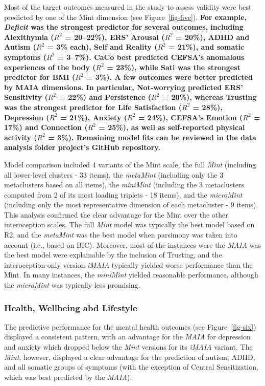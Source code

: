 \documentclass[
  man,
  floatsintext,
  longtable,
  nolmodern,
  notxfonts,
  notimes,
  mask,
  colorlinks=true,linkcolor=blue,citecolor=blue,urlcolor=blue]{apa7}
\begin{document}
Most of the target outcomes measured in the study to assess validity
were best predicted by one of the Mint dimension (see
Figure~\ref{fig-five}). \textbf{For example, \emph{Deficit} was the
strongest predictor for several outcomes, including Alexithymia (\(R^2\)
= 20--22\%), ERS' Arousal (\(R^2\) = 20\%), ADHD and Autism (\(R^2\) =
3\% each), Self and Reality (\(R^2\) = 21\%), and somatic symptoms
(\(R^2\) = 3--7\%). CaCo best predicted CEFSA's anomalous experiences of
the body (\(R^2\) = 23\%), while Sati was the strongest predictor for
BMI (\(R^2\) = 3\%). A few outcomes were better predicted by MAIA
dimensions. In particular, Not-worrying predicted ERS' Sensitivity
(\(R^2\) = 22\%) and Persistence (\(R^2\) = 20\%), whereas Trusting was
the strongest predictor for Life Satisfaction (\(R^2\) = 28\%),
Depression (\(R^2\) = 21\%), Anxiety (\(R^2\) = 24\%), CEFSA's Emotion
(\(R^2\) = 17\%) and Connection (\(R^2\) = 25\%), as well as
self-reported physical activity (\(R^2\) = 3\%). Remaining model fits
can be reviewed in the data analysis folder project's GitHub
repository.}

Model comparison included 4 variants of the Mint scale, the full
\emph{Mint} (including all lower-level clusters - 33 items), the
\emph{metaMint} (including only the 3 metaclusters based on all items),
the \emph{miniMint} (including the 3 metaclusters computed from 2 of its
most loading triplets - 18 items), and the \emph{microMint} (including
only the most representative dimension of each metacluster - 9 items).
This analysis confirmed the clear advantage for the Mint over the other
interoception scales. The full \emph{Mint} model was typically the best
model based on R2, and the \emph{metaMint} was the best model when
parsimony was taken into account (i.e., based on BIC). Moreover, most of
the instances were the \emph{MAIA} was the best model were explainable
by the inclusion of Trusting, and the interoception-only version
\emph{iMAIA} typically yielded worse performance than the Mint. In many
instances, the \emph{miniMint} yielded reasonable performance, although
the \emph{microMint} was typically less promising.

\subsubsection{Health, Wellbeing abd
Lifestyle}\label{health-wellbeing-abd-lifestyle}

The predictive performance for the mental health outcomes (see
Figure~\ref{fig-six}) displayed a consistent pattern, with an advantage
for the \emph{MAIA} for depression and anxiety which dropped below the
\emph{Mint} versions for its \emph{iMAIA} variant. The \emph{Mint},
however, displayed a clear advantage for the prediction of autism, ADHD,
and all somatic groups of symptoms (with the exception of Central
Sensitization, which was best predicted by the \emph{MAIA}).
\end{document}
